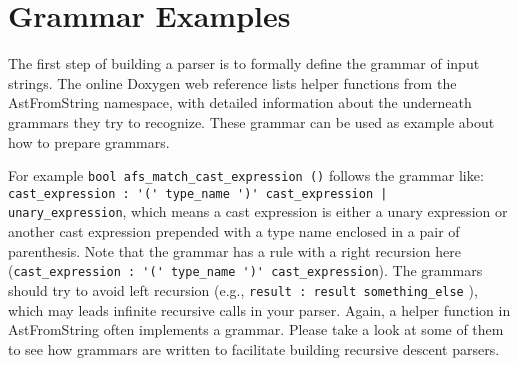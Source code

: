 \section{Grammar Examples}
The first step of  building a parser is to formally define the grammar of input strings. 
The online Doxygen web reference lists helper functions from the AstFromString namespace, with detailed information about the underneath grammars they try to recognize. 
These grammar can be used as example about how to prepare grammars. 

For example \lstinline{bool afs_match_cast_expression ()} follows the grammar like: \\
\lstinline {cast_expression : '(' type_name ')' cast_expression | unary_expression}, which means a cast expression is either a unary expression or another cast expression prepended with a type name enclosed in a pair of parenthesis. Note that the grammar has a rule with a right recursion here (\lstinline {cast_expression : '(' type_name ')' cast_expression}). 
The grammars should try to avoid left recursion (e.g., \lstinline{result : result something_else} ), which may leads infinite recursive calls in your parser.  
Again, a helper function in AstFromString often implements a grammar. Please take a look at some of them to see how grammars are written to facilitate building recursive descent parsers.  

